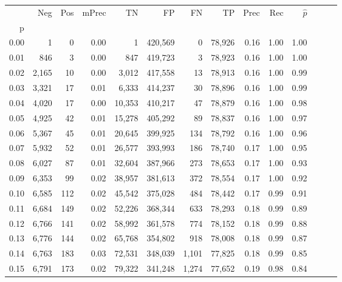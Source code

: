 \begin{tabular}{rrrrrrrrrrrrrr}
\toprule
{} &    Neg &    Pos & mPrec &       TN &       FP &      FN &      TP &  Prec &   Rec & $\hat{p}$ \\
p    &        &        &       &          &          &         &         &       &       &           \\
\midrule
0.00 &      1 &      0 &  0.00 &        1 &  420,569 &       0 &  78,926 &  0.16 &  1.00 &      1.00 \\
0.01 &    846 &      3 &  0.00 &      847 &  419,723 &       3 &  78,923 &  0.16 &  1.00 &      1.00 \\
0.02 &  2,165 &     10 &  0.00 &    3,012 &  417,558 &      13 &  78,913 &  0.16 &  1.00 &      0.99 \\
0.03 &  3,321 &     17 &  0.01 &    6,333 &  414,237 &      30 &  78,896 &  0.16 &  1.00 &      0.99 \\
0.04 &  4,020 &     17 &  0.00 &   10,353 &  410,217 &      47 &  78,879 &  0.16 &  1.00 &      0.98 \\
0.05 &  4,925 &     42 &  0.01 &   15,278 &  405,292 &      89 &  78,837 &  0.16 &  1.00 &      0.97 \\
0.06 &  5,367 &     45 &  0.01 &   20,645 &  399,925 &     134 &  78,792 &  0.16 &  1.00 &      0.96 \\
0.07 &  5,932 &     52 &  0.01 &   26,577 &  393,993 &     186 &  78,740 &  0.17 &  1.00 &      0.95 \\
0.08 &  6,027 &     87 &  0.01 &   32,604 &  387,966 &     273 &  78,653 &  0.17 &  1.00 &      0.93 \\
0.09 &  6,353 &     99 &  0.02 &   38,957 &  381,613 &     372 &  78,554 &  0.17 &  1.00 &      0.92 \\
0.10 &  6,585 &    112 &  0.02 &   45,542 &  375,028 &     484 &  78,442 &  0.17 &  0.99 &      0.91 \\
0.11 &  6,684 &    149 &  0.02 &   52,226 &  368,344 &     633 &  78,293 &  0.18 &  0.99 &      0.89 \\
0.12 &  6,766 &    141 &  0.02 &   58,992 &  361,578 &     774 &  78,152 &  0.18 &  0.99 &      0.88 \\
0.13 &  6,776 &    144 &  0.02 &   65,768 &  354,802 &     918 &  78,008 &  0.18 &  0.99 &      0.87 \\
0.14 &  6,763 &    183 &  0.03 &   72,531 &  348,039 &   1,101 &  77,825 &  0.18 &  0.99 &      0.85 \\
0.15 &  6,791 &    173 &  0.02 &   79,322 &  341,248 &   1,274 &  77,652 &  0.19 &  0.98 &      0.84 \\

\end{tabular}
